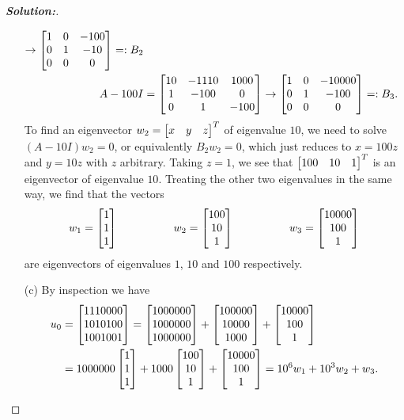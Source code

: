 \documentclass[a4paper]{amsart}
\theoremstyle{definition}
\newenvironment{solution}{\begin{proof}[\textbf{Solution:}] \vphantom{u}}{\end{proof}}
\begin{document}
\begin{solution}
\begin{itemize}
\begin{align*}
            \to \left[\begin{matrix} 1 & 0 & -100 \\ 0 & 1 & -10 \\ 0 & 0 & 0 \end{matrix}\right] =: B_2\\
    A-100I &= \left[\begin{matrix} 10 & -1110 & 1000 \\ 1 & -100 & 0 \\ 0 & 1 & -100 \end{matrix}\right] 
            \to \left[\begin{matrix} 1 & 0 & -10000 \\ 0 & 1 & -100 \\ 0 & 0 & 0 \end{matrix}\right] =: B_3.
   \end{align*}
   To find an eigenvector $w_2=\left[\begin{matrix} x & y & z\end{matrix}\right]^T$ of eigenvalue
   $10$, we need to solve $(A-10I)w_2=0$, or equivalently $B_2w_2=0$,
   which just reduces to $x=100z$ and $y=10z$ with $z$ arbitrary.
   Taking $z=1$, we see that $\left[\begin{matrix} 100 & 10 & 1\end{matrix}\right]^T$ is an
   eigenvector of eigenvalue $10$.  Treating the other two eigenvalues
   in the same way, we find that the vectors
   \[ w_1 = \left[\begin{matrix} 1 \\ 1 \\ 1 \end{matrix}\right] \hspace{5em}
      w_2 = \left[\begin{matrix} 100 \\ 10 \\ 1 \end{matrix}\right] \hspace{5em}
      w_3 = \left[\begin{matrix} 10000 \\ 100 \\ 1 \end{matrix}\right]
   \]
   are eigenvectors of eigenvalues $1$, $10$ and $100$ respectively.
  \item[(c)] By inspection we have
   \begin{align*}
    u_0 &= \left[\begin{matrix} 1110000 \\ 1010100 \\ 1001001\end{matrix}\right] 
       = \left[\begin{matrix} 1000000 \\ 1000000 \\ 1000000\end{matrix}\right] +
         \left[\begin{matrix}  100000 \\   10000 \\    1000\end{matrix}\right] +
         \left[\begin{matrix}   10000 \\     100 \\       1\end{matrix}\right]  \\
      &= 1000000 \left[\begin{matrix} 1 \\ 1 \\ 1\end{matrix}\right] +
         1000 \left[\begin{matrix} 100 \\ 10 \\ 1\end{matrix}\right] +
         \left[\begin{matrix} 10000 \\ 100 \\ 1\end{matrix}\right] 
       = 10^6 w_1 + 10^3 w_2 + w_3.
   \end{align*}

\end{itemize}
\end{solution}
\end{document}
